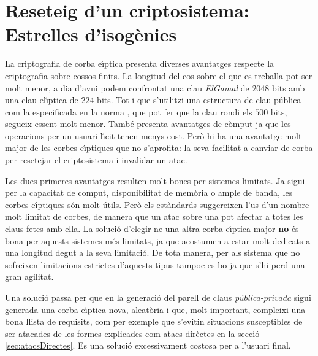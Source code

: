 \documentclass[12pt,twoside,catalan,a4paper]{book}%
\numberwithin{figure}{section}		%
\theoremstyle{definition}   			%
\def\ce{corba e\lgem{}\'{\i}ptica}%
\def\ces{corbes e\lgem{}\'{\i}ptiques}%
\def\cfs{cossos finits}%
\theoremstyle{saltolinea}   			%
\begin{document}

\chapter{Reseteig d'un criptosistema: Estrelles d'isog\`enies}\label{ch:EstrellesIso}

La criptografia de \ce{} presenta diverses avantatges respecte la criptografia sobre \cfs. La longitud del cos sobre el que es treballa pot ser molt menor, a dia d'avui podem confrontat una clau \emph{ElGamal} de $2048$ bits amb una clau el\lgem{}\'{\i}ptica de $224$ bits. Tot i que s'utilitzi una estructura de clau p\'ublica com la especificada en la norma \cite{ECPGP}, que pot fer que la clau rondi els $500$ bits, segueix essent molt menor. Tamb\'e presenta avantatges de c\`omput ja que les operacions per un usuari l\'{\i}cit tenen menys cost. Per\`o hi ha una avantatge molt major de les \ces{} que no s'aprofita: la seva facilitat a canviar de corba per resetejar el criptosistema i invalidar un atac.

Les dues primeres avantatges resulten molt bones per sistemes limitats. Ja sigui per la capacitat de comput, disponibilitat de mem\`oria o ample de banda, les \ces{} s\'on molt \'utils. Per\`o els est\`andards suggereixen l'us d'un nombre molt limitat de corbes, de manera que un atac sobre una pot afectar a totes les claus fetes amb ella. La soluci\'o d'elegir-ne una altra \ce{} major {\bf no} \'es bona per aquests sistemes m\'es limitats, ja que acostumen a estar molt dedicats a una longitud degut a la seva limitaci\'o. De tota manera, per als sistema que no sofreixen limitacions estrictes d'aquests tipus tampoc es bo ja que s'hi perd una gran agilitat.

Una soluci\'o passa per que en la generaci\'o del parell de claus \emph{p\'ublica-privada} sigui generada una \ce{} nova, aleat\`oria i que, molt important, compleixi una bona llista de requisits, com per exemple que s'evitin situacions susceptibles de ser atacades de les formes explicades com atacs dir\`ectes en la secci\'o \ref{sec:atacsDirectes}. Es una soluci\'o excessivament costosa per a l'usuari final.
\end{document}
